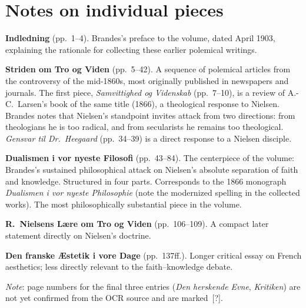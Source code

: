 \documentclass[12pt]{article}
\begin{document}
\bigskip
\section*{Notes on individual pieces}

\textbf{Indledning} (pp.~1--4). Brandes's preface to the volume,
dated April 1903, explaining the rationale for collecting these
earlier polemical writings.

\textbf{Striden om Tro og Viden} (pp.~5--42). A sequence of
polemical articles from the controversy of the mid-1860s, most
originally published in newspapers and journals. The first piece,
\textit{Samvittighed og Videnskab} (pp.~7--10), is a review of
A.-C.\ Larsen's book of the same title (1866), a theological
response to Nielsen. Brandes notes that Nielsen's standpoint
invites attack from two directions: from theologians he is too
radical, and from secularists he remains too theological.
\textit{Gensvar til Dr.\ Heegaard} (pp.~34--39) is a direct
response to a Nielsen disciple.

\textbf{Dualismen i vor nyeste Filosofi} (pp.~43--84). The
centerpiece of the volume: Brandes's sustained philosophical
attack on Nielsen's absolute separation of faith and knowledge.
Structured in four parts. Corresponds to the 1866 monograph
\textit{Dualismen i vor nyeste Philosophie} (note the modernized
spelling in the collected works). The most philosophically
substantial piece in the volume.

\textbf{R.\ Nielsens L\ae{}re om Tro og Viden} (pp.~106--109).
A compact later statement directly on Nielsen's doctrine.

\textbf{Den franske \AE{}stetik i vore Dage} (pp.~137ff.). Longer
critical essay on French aesthetics; less directly relevant to
the faith--knowledge debate.

\bigskip
\textit{Note}: page numbers for the final three entries
(\textit{Den herskende Evne}, \textit{Kritiken}) are not yet
confirmed from the OCR source and are marked~[?].
\end{document}

